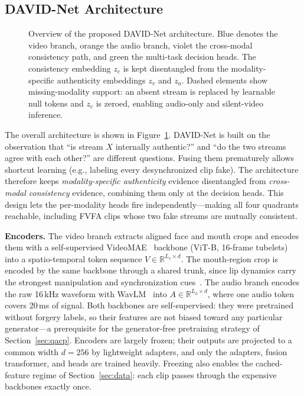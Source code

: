 \subsection{DAVID-Net Architecture}
\label{sec:davidnet}

\begin{figure}[htbp]
  \centering
  
  \caption{Overview of the proposed DAVID-Net architecture. Blue denotes the
  video branch, orange the audio branch, violet the cross-modal consistency
  path, and green the multi-task decision heads. The consistency embedding
  $z_c$ is kept disentangled from the modality-specific authenticity
  embeddings $z_v$ and $z_a$. Dashed elements show missing-modality support:
  an absent stream is replaced by learnable null tokens and $z_c$ is zeroed,
  enabling audio-only and silent-video inference.}
  \label{fig:architecture}
\end{figure}

The overall architecture is shown in Figure~\ref{fig:architecture}.
DAVID-Net is built on the observation that ``is stream $X$ internally
authentic?'' and ``do the two streams agree with each other?'' are different
questions. Fusing them prematurely allows shortcut learning (e.g., labeling
every desynchronized clip fake). The architecture therefore keeps
\emph{modality-specific authenticity} evidence disentangled from
\emph{cross-modal consistency} evidence, combining them only at the decision
heads. This design lets the per-modality heads fire independently---making all
four quadrants reachable, including FVFA clips whose two fake streams are
mutually consistent.

\textbf{Encoders.} The video branch extracts aligned face and mouth crops and
encodes them with a self-supervised VideoMAE~\cite{tong2022videomae} backbone
(ViT-B, 16-frame tubelets) into a spatio-temporal token sequence
$V \in \mathbb{R}^{L_v \times d}$. The mouth-region crop is encoded by the
same backbone through a shared trunk, since lip dynamics carry the strongest
manipulation and synchronization cues~\cite{haliassos2021lipforensics}. The
audio branch encodes the raw 16\,kHz waveform with
WavLM~\cite{chen2022wavlm} into $A \in \mathbb{R}^{L_a \times d}$, where one
audio token covers 20\,ms of signal. Both backbones are self-supervised:
they were pretrained without forgery labels, so their features are not
biased toward any particular generator---a prerequisite for the
generator-free pretraining strategy of Section~\ref{sec:qacp}. Encoders are
largely frozen; their outputs are projected to a common width $d{=}256$ by
lightweight adapters, and only the adapters, fusion transformer, and heads
are trained heavily. Freezing also enables the cached-feature regime of
Section~\ref{sec:data}: each clip passes through the expensive backbones
exactly once.

